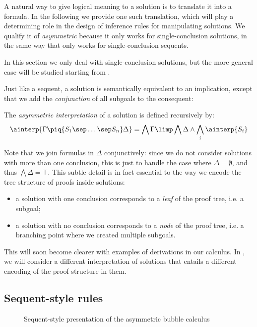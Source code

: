 A natural way to give logical meaning to a solution is to translate it into a
formula. In the following we provide one such translation, which will play a
determining role in the design of inference rules for manipulating solutions. We
qualify it of \emph{asymmetric} because it only works for single-conclusion
solutions, in the same way that  only works for single-conclusion
sequents.

\begin{remark}
In this section we only deal with single-conclusion solutions, but the more
general case will be studied starting from .
\end{remark}

Just like a sequent, a solution is semantically equivalent to an implication,
except that we add the \emph{conjunction} of all subgoals to the consequent:

\begin{definition}
  The \emph{asymmetric interpretation} of a solution is defined recursively by:
  $$\ainterp{\Gamma \piq{S_1 \sep \ldots \sep S_n} \Delta} = \bigwedge \Gamma
    \limp \bigwedge \Delta \land \bigwedge_i{\ainterp{S_i}}$$
\end{definition}

Note that we join formulas in $\Delta$ conjunctively: since we do not consider
solutions with more than one conclusion, this is just to handle the case where
$\Delta = \emptyset$, and thus $\bigwedge \Delta = \top$. This subtle detail is
in fact essential to the way we encode the tree structure of proofs inside
solutions:
\begin{itemize}
  \item a solution with one conclusion corresponds to a \emph{leaf} of the proof
  tree, i.e. a subgoal;
  \item a solution with no conclusion corresponds to a \emph{node} of the proof
  tree, i.e. a branching point where we created multiple subgoals.
\end{itemize}
This will soon become clearer with examples of derivations in our calculus. In
, we will consider a different interpretation of
solutions that entails a different encoding of the proof structure in them.

\subsection{Sequent-style rules}

\begin{figure*}
  
  \caption{Sequent-style presentation of the asymmetric bubble calculus }
\end{figure*}

